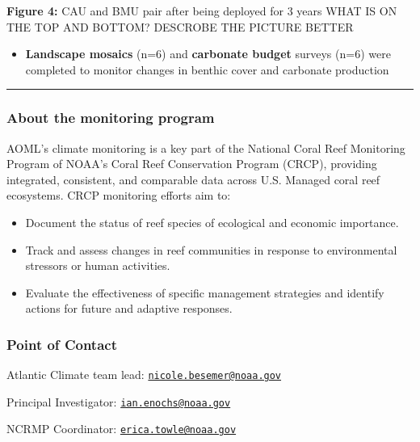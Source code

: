 \documentclass[]{article}
\providecommand{\tightlist}{%
  \setlength{\itemsep}{0pt}\setlength{\parskip}{0pt}}
\begin{document}
 \textbf{Figure 4:} CAU and BMU pair after being deployed for 3 years
WHAT IS ON THE TOP AND BOTTOM? DESCROBE THE PICTURE BETTER

\begin{itemize}
\tightlist
\item
  \textbf{Landscape mosaics} (n=6) and \textbf{carbonate budget} surveys
  (n=6) were completed to monitor changes in benthic cover and carbonate
  production
\end{itemize}

\begin{center}\rule{0.5\linewidth}{0.5pt}\end{center}

\hypertarget{about-the-monitoring-program}{%
\subsubsection{About the monitoring
program}\label{about-the-monitoring-program}}

AOML's climate monitoring is a key part of the National Coral Reef
Monitoring Program of NOAA's Coral Reef Conservation Program (CRCP),
providing integrated, consistent, and comparable data across U.S.
Managed coral reef ecosystems. CRCP monitoring efforts aim to:

\begin{itemize}
\tightlist
\item
  Document the status of reef species of ecological and economic
  importance.
\item
  Track and assess changes in reef communities in response to
  environmental stressors or human activities.
\item
  Evaluate the effectiveness of specific management strategies and
  identify actions for future and adaptive responses.
\end{itemize}

\hypertarget{point-of-contact}{%
\subsubsection{Point of Contact}\label{point-of-contact}}

Atlantic Climate team lead:
\href{mailto:nicole.besemer@noaa.gov}{\nolinkurl{nicole.besemer@noaa.gov}}

Principal Investigator:
\href{mailto:ian.enochs@noaa.gov}{\nolinkurl{ian.enochs@noaa.gov}}

NCRMP Coordinator:
\href{mailto:erica.towle@noaa.gov}{\nolinkurl{erica.towle@noaa.gov}}
\end{document}
